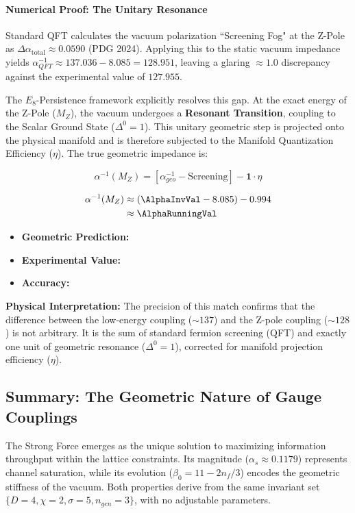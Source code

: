 \paragraph{Numerical Proof: The Unitary Resonance}
Standard QFT calculates the vacuum polarization ``Screening Fog" at the Z-Pole as $\Delta \alpha_{\text{total}} \approx 0.0590$ (PDG 2024). Applying this to the static vacuum impedance yields $\alpha^{-1}_{QFT} \approx 137.036 - 8.085 = 128.951$, leaving a glaring $\approx 1.0$ discrepancy against the experimental value of $127.955$.

The $E_8$-Persistence framework explicitly resolves this gap. At the exact energy of the Z-Pole ($M_Z$), the vacuum undergoes a \textbf{Resonant Transition}, coupling to the Scalar Ground State ($\Delta^0 = 1$). This unitary geometric step is projected onto the physical manifold and is therefore subjected to the Manifold Quantization Efficiency ($\eta$). The true geometric impedance is:

\begin{equation}
\alpha^{-1}(M_Z) = \left[ \alpha^{-1}_{geo} - \text{Screening} \right] - \mathbf{1} \cdot \eta
\end{equation}

\begin{equation}
\begin{split}   
\alpha^{-1}(M_Z) 
& \approx (\AlphaInvVal - 8.085) - 0.994 \\
& \approx \mathbf{\AlphaRunningVal}
\end{split}
\end{equation}

\begin{itemize}
    \item \textbf{Geometric Prediction:} \AlphaRunningVal
    \item \textbf{Experimental Value:} \AlphaRunningExperimentalValue
    \item \textbf{Accuracy:} \AlphaRunningAccText
\end{itemize}

\textbf{Physical Interpretation:} The precision of this match confirms that the difference between the low-energy coupling ($\sim 137$) and the Z-pole coupling ($\sim 128$) is not arbitrary. It is the sum of standard fermion screening (QFT) and exactly one unit of geometric resonance ($\Delta^0=1$), corrected for manifold projection efficiency ($\eta$).

\subsection{Summary: The Geometric Nature of Gauge Couplings}
The Strong Force emerges as the unique solution to maximizing information throughput within the lattice constraints. Its magnitude ($\alpha_s \approx 0.1179$) represents channel saturation, while its evolution ($\beta_0 = 11 - 2n_f/3$) encodes the geometric stiffness of the vacuum. Both properties derive from the same invariant set $\{D=4, \chi=2, \sigma=5, n_{gen}=3\}$, with no adjustable parameters.

